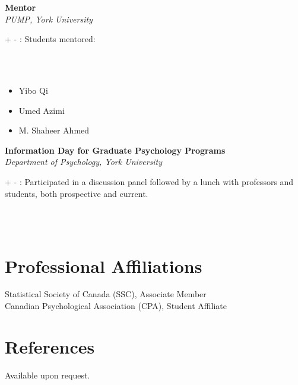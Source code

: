 \documentclass[12pt]{article}
\makeatletter
\newlength{\entryskip}
\newcommand{\entrygap}{\par\vspace{\entryskip}}
\newlength{\detaillabelwidth}
\newcommand{\smallitem}[2][]{%
  \par{\small\color{dimgray}%
  \ifx\relax#1\relax\else
    \settowidth{\detaillabelwidth}{\textit{#1}: }%
    \parshape 2 \@totalleftmargin \linewidth
      \dimexpr\@totalleftmargin+\detaillabelwidth\relax
      \dimexpr\linewidth-\detaillabelwidth\relax
    \textit{#1}: %
  \fi
  #2\par}%
  \@ifnextchar\\{\smallitem@gobblecr}{}}
\def\smallitem@gobblecr\\{\@ifnextchar[{\smallitem@gobbleopt}{}}
\def\smallitem@gobbleopt[#1]{}
\makeatother
\begin{document}
\textbf{Mentor} \\
\textit{PUMP, York University}\\
\smallitem{Students mentored:}
{\small\color{dimgray}
\begin{itemize}
    \item Yibo Qi 
    \item Umed Azimi 
    \item M. Shaheer Ahmed 
\end{itemize}}
\entrygap

\textbf{Information Day for Graduate Psychology Programs} \\
\textit{Department of Psychology, York University}\\
\smallitem{Participated in a discussion panel followed by a lunch with professors and students, both prospective and current.}

\section{Professional Affiliations}
Statistical Society of Canada (SSC), Associate Member \\
Canadian Psychological Association (CPA), Student Affiliate 

\section{References}
Available upon request.
\end{document}
